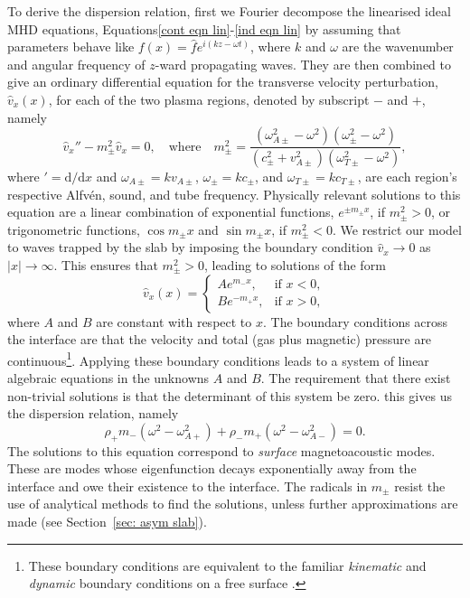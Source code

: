 \documentclass[12pt]{../style-files/ociamthesis}
\begin{document}
To derive the dispersion relation, first we Fourier decompose the linearised ideal MHD equations, Equations\eqref{cont eqn lin}-\eqref{ind eqn lin} by assuming that parameters behave like $f(x) = \hat{f}e^{i(kz - \omega t)}$, where $k$ and $\omega$ are the wavenumber and angular frequency of $z$-ward propagating waves. They are then combined to give an ordinary differential equation for the transverse velocity perturbation, $\hat{v}_x(x)$, for each of the two plasma regions, denoted by subscript $-$ and $+$, namely
\begin{equation}
\hat{v}_x'' - m_\pm^2\hat{v}_x = 0, \quad \text{where} \quad
m_\pm^2 = \frac{(\omega_{A\pm}^2 - \omega^2)(\omega_\pm^2 - \omega^2)}{(c_\pm^2 + v_{A\pm}^2)(\omega_{T\pm}^2 - \omega^2)},
\end{equation}
where $'=\textrm{d}/\textrm{d}x$ and $\omega_{A\pm} = kv_{A\pm}$, $\omega_{\pm} = kc_{\pm}$, and $\omega_{T\pm} = kc_{T\pm}$, are each region's respective Alfv\'{e}n, sound, and tube frequency. Physically relevant solutions to this equation are a linear combination of exponential functions, $e^{\pm m_\pm x}$, if $m_\pm^2 > 0$, or trigonometric functions, $\cos{m_\pm x}$ and $\sin{m_\pm x}$, if $m_\pm^2 < 0$. We restrict our model to waves trapped by the slab by imposing the boundary condition $\hat{v}_x \to 0$ as $|x| \to \infty$. This ensures that $m_\pm^2 > 0$, leading to solutions of the form
\begin{equation}
\hat{v}_x(x)=
\begin{cases}
Ae^{m_-x}, & \text{if } x < 0, \\
Be^{-m_+x}, & \text{if } x > 0,
\end{cases} \label{vsoln}
\end{equation}
where $A$ and $B$ are constant with respect to $x$. The boundary conditions across the interface are that the velocity and total (gas plus magnetic) pressure are continuous\footnote{These boundary conditions are equivalent to the familiar \textit{kinematic} and \textit{dynamic} boundary conditions on a free surface \cite{goe_etal04}.}. Applying these boundary conditions leads to a system of linear algebraic equations in the unknowns $A$ and $B$. The requirement that there exist non-trivial solutions is that the determinant of this system be zero. this gives us the dispersion relation, namely
\begin{equation}
	\rho_+m_-(\omega^2 - \omega_{A+}^2) + \rho_-m_+(\omega^2 - \omega_{A-}^2) = 0. \label{DR interface}
\end{equation}
The solutions to this equation correspond to \textit{surface} magnetoacoustic modes. These are modes whose eigenfunction decays exponentially away from the interface and owe their existence to the interface. The radicals in $m_\pm$ resist the use of analytical methods to find the solutions, unless further approximations are made (see Section~\ref{sec: asym slab}).
\end{document}
